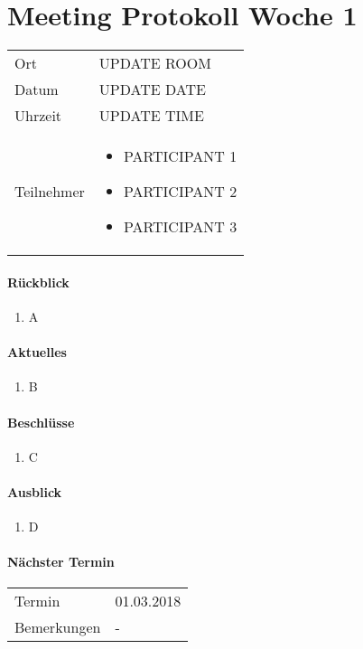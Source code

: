 \section{Meeting Protokoll Woche 1}

\begin{table}[h!]
	\begin{tabularx}{\textwidth}{l X }

		Ort & UPDATE ROOM \\
		Datum & UPDATE DATE \\
		Uhrzeit & UPDATE TIME \\
		Teilnehmer & 
		\begin{minipage}[t]{\textwidth}
			\begin{itemize}
				\item PARTICIPANT 1
				\item PARTICIPANT 2
				\item PARTICIPANT 3
			\end{itemize}
		\end{minipage}
	\end{tabularx}
\end{table}

\paragraph{Rückblick}
\begin{enumerate}
	\item A
\end{enumerate}

\paragraph{Aktuelles}
\begin{enumerate}
	\item B
\end{enumerate}

\paragraph{Beschlüsse}
\begin{enumerate}
	\item C
\end{enumerate}

\paragraph{Ausblick}
\begin{enumerate}
	\item D
\end{enumerate}


\paragraph{Nächster Termin} \hfill
\begin{table}[h!]
	\begin{tabularx}{\textwidth}{l X }
		Termin & 01.03.2018 \\
		Bemerkungen & - \\
	\end{tabularx}
\end{table}

\clearpage